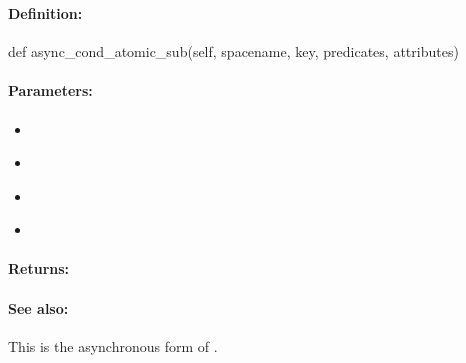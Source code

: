 \pagebreak
\subsubsection{}
\label{api:python:async_cond_atomic_sub}


\paragraph{Definition:}
\begin{pythoncode}
def async_cond_atomic_sub(self, spacename, key, predicates, attributes)
\end{pythoncode}

\paragraph{Parameters:}
\begin{itemize}[noitemsep]
\item {}\\

\item {}\\

\item {}\\

\item {}\\

\end{itemize}

\paragraph{Returns:}


\paragraph{See also:}  This is the asynchronous form of .

\pagebreak
\subsubsection{}
\label{api:python:atomic_mul}


